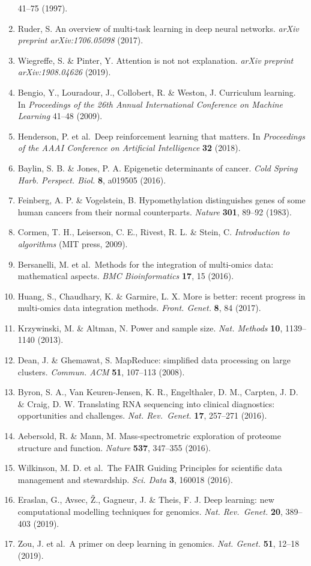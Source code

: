 \begin{enumerate}
  41--75 (1997).
\item
  Ruder, S. An overview of multi-task learning in deep neural networks.
  \emph{arXiv preprint arXiv:1706.05098} (2017).
\item
  Wiegreffe, S. \& Pinter, Y. Attention is not not explanation.
  \emph{arXiv preprint arXiv:1908.04626} (2019).
\item
  Bengio, Y., Louradour, J., Collobert, R. \& Weston, J. Curriculum
  learning. In \emph{Proceedings of the 26th Annual International
  Conference on Machine Learning} 41--48 (2009).
\item
  Henderson, P. et al.~Deep reinforcement learning that matters. In
  \emph{Proceedings of the AAAI Conference on Artificial Intelligence}
  \textbf{32} (2018).
\item
  Baylin, S. B. \& Jones, P. A. Epigenetic determinants of cancer.
  \emph{Cold Spring Harb. Perspect. Biol.} \textbf{8}, a019505 (2016).
\item
  Feinberg, A. P. \& Vogelstein, B. Hypomethylation distinguishes genes
  of some human cancers from their normal counterparts. \emph{Nature}
  \textbf{301}, 89--92 (1983).
\item
  Cormen, T. H., Leiserson, C. E., Rivest, R. L. \& Stein, C.
  \emph{Introduction to algorithms} (MIT press, 2009).
\item
  Bersanelli, M. et al.~Methods for the integration of multi-omics data:
  mathematical aspects. \emph{BMC Bioinformatics} \textbf{17}, 15
  (2016).
\item
  Huang, S., Chaudhary, K. \& Garmire, L. X. More is better: recent
  progress in multi-omics data integration methods. \emph{Front. Genet.}
  \textbf{8}, 84 (2017).
\item
  Krzywinski, M. \& Altman, N. Power and sample size. \emph{Nat.
  Methods} \textbf{10}, 1139--1140 (2013).
\item
  Dean, J. \& Ghemawat, S. MapReduce: simplified data processing on
  large clusters. \emph{Commun. ACM} \textbf{51}, 107--113 (2008).
\item
  Byron, S. A., Van Keuren-Jensen, K. R., Engelthaler, D. M., Carpten,
  J. D. \& Craig, D. W. Translating RNA sequencing into clinical
  diagnostics: opportunities and challenges. \emph{Nat. Rev.~Genet.}
  \textbf{17}, 257--271 (2016).
\item
  Aebersold, R. \& Mann, M. Mass-spectrometric exploration of proteome
  structure and function. \emph{Nature} \textbf{537}, 347--355 (2016).
\item
  Wilkinson, M. D. et al.~The FAIR Guiding Principles for scientific
  data management and stewardship. \emph{Sci. Data} \textbf{3}, 160018
  (2016).
\item
  Eraslan, G., Avsec, Ž., Gagneur, J. \& Theis, F. J. Deep learning: new
  computational modelling techniques for genomics. \emph{Nat.
  Rev.~Genet.} \textbf{20}, 389--403 (2019).
\item
  Zou, J. et al.~A primer on deep learning in genomics. \emph{Nat.
  Genet.} \textbf{51}, 12--18 (2019).
\end{enumerate}
